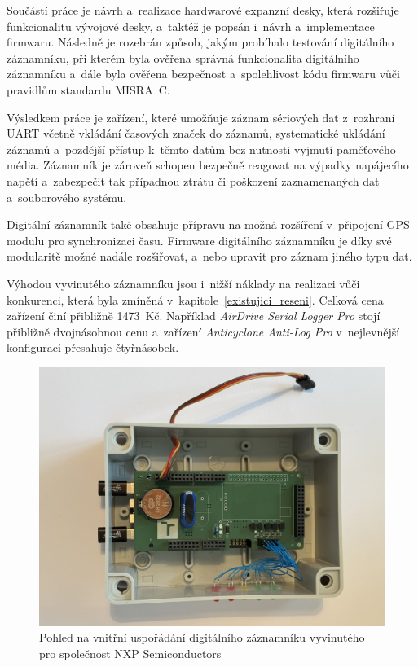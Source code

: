 Součástí práce je návrh a~realizace hardwarové expanzní desky, která rozšiřuje funkcionalitu vývojové desky, a~taktéž je popsán i~návrh a~implementace firmwaru. Následně je rozebrán způsob, jakým probíhalo testování digitálního záznamníku, při kterém byla ověřena správná funkcionalita digitálního záznamníku a~dále byla ověřena bezpečnost a~spolehlivost kódu firmwaru vůči pravidlům standardu MISRA~C. 

Výsledkem práce je zařízení, které umožňuje záznam sériových dat z~rozhraní UART včetně vkládání časových značek do záznamů, systematické ukládání záznamů a~pozdější přístup k~těmto datům bez nutnosti vyjmutí paměťového média. Záznamník je zároveň schopen bezpečně reagovat na výpadky napájecího napětí a~zabezpečit tak případnou ztrátu či poškození zaznamenaných dat a~souborového systému. 

Digitální záznamník také obsahuje přípravu na možná rozšíření v~připojení GPS modulu pro synchronizaci času. Firmware digitálního záznamníku je díky své modularitě možné nadále rozšiřovat, a~nebo upravit pro záznam jiného typu dat.

Výhodou vyvinutého záznamníku jsou i~nižší náklady na realizaci vůči konkurenci, která byla zmíněná v~kapitole~\ref{existujici_reseni}. Celková cena zařízení činí přibližně 1473~Kč. Například \textit{AirDrive Serial Logger Pro} stojí přibližně dvojnásobnou cenu a~zařízení \textit{Anticyclone Anti-Log Pro} v~nejlevnější konfiguraci přesahuje čtyřnásobek.

\begin{figure}[h]
    \centering
    \includegraphics[width=1.00\textwidth, angle=180]{obrazky-figures/serial-datalogger-nxp.jpg}
    
    \caption{Pohled na vnitřní uspořádání digitálního záznamníku vyvinutého pro společnost NXP Semiconductors}
    \label{fig:serial-datalogger-nxp}
\end{figure}



%
